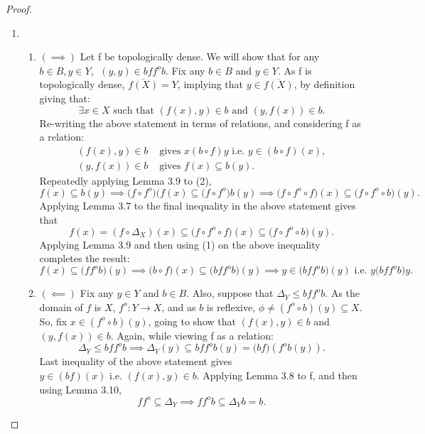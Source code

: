 \documentclass[a4paper]{article}
\theoremstyle{definition}
\begin{document}
\begin{proof}
\begin{enumerate}[label=(\alph*)]
\begin{enumerate}[label=(\roman*)]
				\end{enumerate}
			\item \begin{enumerate}[label=(\roman*)]
				\item $(\implies)$ Let f be topologically dense. We will show that
					for any $b\in B, y \in Y$, $\;(y,y) \in bff^ob$. Fix any $ b\in B$ and
					$y \in Y$. As f is topologically dense, $\overline{f(X)}=Y $, implying
					that $y\in \overline{f(X)}$, by definition giving that:
					\[ \exists x\in X \text{ such that }
					(f(x),y) \in b \text{ and } (y,f(x)) \in b .\]
					Re-writing the above statement in terms of relations, and
					considering f as a relation:
					\begin{align}
						(f(x),y) \in b &\text{ gives }  x(b \circ f)y \text{ i.e. }
						y \in (b \circ f)(x),\\
						(y,f(x)) \in b &\text{ gives } f(x)\subseteq b(y).
					\end{align}
					Repeatedly applying Lemma 3.9 to (2),
					\[ f(x) \subseteq b(y) \implies
						\big(f \circ f^o \big)(f(x) \subseteq \big(f \circ f^o \big)b(y)
						\implies \big(f \circ f^o \circ f\big)(x) \subseteq
					\big(f \circ f^o \circ b \big)(y).\]
					Applying Lemma 3.7 to the final inequality
					in the above statement gives that
					\[f(x)= (f\circ  \Delta_X) (x)
						\subseteq \big(f \circ f^o \circ f\big)(x) \subseteq
					\big(f \circ f^o \circ b \big)(y). \]
					Applying Lemma 3.9
					and then using (1) on the above inequality completes the result:
					\[ f(x) \subseteq \big(ff^ob \big)(y)
						\implies \big(b \circ f\big)(x) \subseteq
					\big(bff^ob \big)(y) \implies y \in \big(bff^ob \big)(y) \text{ i.e. } y\big(bff^ob \big)y  . \]
				\item $(\impliedby)$ Fix any $y \in Y$ and $b \in B$. Also, suppose that
					$\Delta_Y \leq bff^o b$. As the domain of $f$ is $X$,
					$f^o :Y \to X$, and as $b$ is reflexive, $\phi \neq (f^o \circ b)(y)
					\subseteq  X$. So, fix $x\in (f^o \circ b)(y)$, going to show that
					$(f(x),y)\in b$	and $(y,f(x)) \in b$. Again, while viewing f as a
					relation:
					\[ \Delta_Y \leq bff^ob
						\implies \Delta_Y(y) \subseteq bf f^o b(y)=\big(bf\big)
					(f^o b(y)).\]
					Last inequality of the above statement gives $y \in (bf)(x)
					\text{ i.e. } (f(x),y)\in b $.
					Applying Lemma 3.8 to f, and then using Lemma 3.10,
					\begin{equation*}
						ff^o  \subseteq \Delta_Y \implies f f^o b \subseteq \Delta_Yb=b.
					\end{equation*}

\end{enumerate}
\end{enumerate}
\end{proof}
\end{document}
